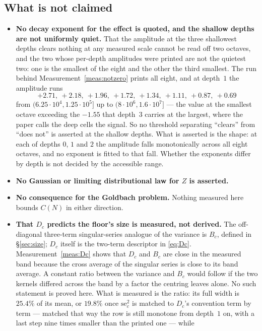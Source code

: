 \documentclass[11pt,a4paper]{article}
\theoremstyle{plain}
\theoremstyle{definition}
\theoremstyle{remark}
\begin{document}
\subsection{What is not claimed}\label{sec:notclaimed}

\begin{itemize}
\item \textbf{No decay exponent for the effect is quoted, and the
shallow depths are not uniformly quiet.} That the amplitude at the
three shallowest depths clears nothing at any measured scale cannot be
read off two octaves, and the two whose per-depth amplitudes were
printed are not the quietest two: one is the smallest of the eight and
the other the third smallest.
The run behind Measurement~\ref{meas:notzero} prints all eight, and at
depth~$1$ the amplitude runs
\[
  +2.71,\ +2.18,\ +1.96,\ +1.72,\ +1.34,\ +1.11,\ +0.87,\ +0.69
\]
from $(6.25\cdot10^4,1.25\cdot10^5]$ up to
$(8\cdot10^6,1.6\cdot10^7]$ --- the value at the smallest octave
exceeding the $-1.55$ that depth~$3$ carries at the largest, where the
paper calls the deep cells the signal. So no threshold separating
``clears'' from ``does not'' is asserted at the shallow depths. What
is asserted is the shape: at each of depths $0$, $1$ and $2$ the
amplitude falls monotonically across all eight octaves, and no
exponent is fitted to that fall. Whether the exponents differ by depth
is not decided by the accessible range.
\item \textbf{No Gaussian or limiting distributional law for $Z$ is asserted.}
\item \textbf{No consequence for the Goldbach problem.} Nothing
measured here bounds $C(N)$ in either direction.
\item \textbf{That $D_c$ predicts the floor's size is measured, not
derived.} The off-diagonal three-term singular-series analogue of the
variance is $B_c$, defined in \S\ref{sec:size}; $D_c$ itself is the
two-term descriptor in \eqref{eq:Dc}. Measurement~\ref{meas:Dc}
shows that $D_c$ and $B_c$ are close in the measured band because the
cross average of the singular series is close to its band average. A
constant ratio between the variance and $B_c$ would follow if the two
kernels differed across the band by a factor the centring leaves alone.
No such statement is proved here. What is measured is the
ratio: its full width is $25.4\%$ of its mean, or $19.8\%$ once
$\mathrm{se}_c^2$ is matched to $D_c$'s convention term by term ---
matched that way the row is still monotone from depth~$1$ on, with a
last step nine times smaller than the printed one --- while

\end{itemize}
\end{document}
